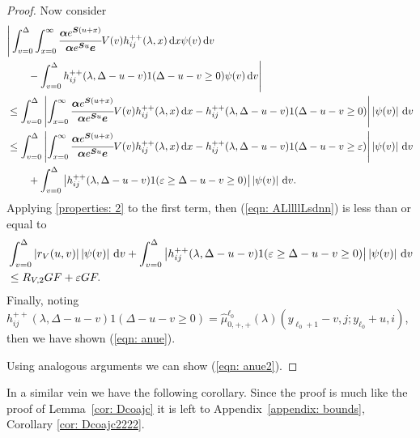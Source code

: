 \begin{proof}
                Now consider 
                \begin{align}
                	&\Bigg|\int_{v=0}^\Delta \int_{x=0}^\infty \cfrac{\boldsymbol \alpha e^{\boldsymbol{S}(u+x)} }{\boldsymbol \alpha e^{\boldsymbol{S}u} \boldsymbol e} V(v)h_{ij}^{++} (\lambda,x)\, \mathrm{d} x \psi(v)\, \mathrm{d} v  \nonumber 
		\\&\qquad{}- \int_{v=0}^\Delta h_{ij}^{++}(\lambda,\Delta-u-v) 1(\Delta-u-v\geq 0) \psi(v)\, \mathrm{d} v\Bigg| \nonumber 
                	\\&\leq \int_{v=0}^\Delta \left|  \int_{x=0}^\infty \cfrac{\boldsymbol \alpha e^{\boldsymbol{S}(u+x)} }{\boldsymbol \alpha e^{\boldsymbol{S}u} \boldsymbol e} V(v)h_{ij}^{++} (\lambda,x)\, \mathrm{d} x  - h_{ij}^{++}(\lambda,\Delta-u-v) 1(\Delta-u-v\geq 0) \right| \left| \psi(v) \right| \, \mathrm{d} v\nonumber 
                	\\&\leq \int_{v=0}^\Delta \left|  \int_{x=0}^\infty \cfrac{\boldsymbol \alpha e^{\boldsymbol{S}(u+x)} }{\boldsymbol \alpha e^{\boldsymbol{S}u} \boldsymbol e} V(v)h_{ij}^{++} (\lambda,x)\, \mathrm{d} x  - h_{ij}^{++}(\lambda,\Delta-u-v) 1(\Delta-u-v\geq \varepsilon) \right| \left| \psi(v) \right| \, \mathrm{d} v\nonumber 
                	\\&\qquad {}+ \int_{v=0}^\Delta \left| h_{ij}^{++}(\lambda,\Delta-u-v) 1(\varepsilon \geq \Delta-u-v\geq 0) \right| \left| \psi(v) \right| \, \mathrm{d} v. \label{eqn: ALllllLsdnn}
                \end{align}
                Applying \ref{properties: 2} to the first term, then (\ref{eqn: ALllllLsdnn}) is less than or equal to 
                \begin{align}
                	& \int_{v=0}^\Delta |r_V(u,v)| \left| \psi(v) \right| \, \mathrm{d} v 
                	+ \int_{v=0}^\Delta \left| h_{ij}^{++}(\lambda,\Delta-u-v) 1(\varepsilon \geq \Delta-u-v\geq 0) \right| \left| \psi(v) \right| \, \mathrm{d} v\nonumber 
                	\\&\leq R_{V,2} GF + \varepsilon GF. \nonumber 
                \end{align}
                Finally, noting \(h_{ij}^{++}(\lambda,\Delta-u-v) 1(\Delta-u-v\geq 0)=\widehat \mu_{0,+,+}^{\ell_0}(\lambda)(y_{\ell_0+1}-v,j;y_{\ell_0}+u,i)\), then we have shown (\ref{eqn: anue}). 
                
                Using analogous arguments we can show  (\ref{eqn: anue2}).
\end{proof}
In a similar vein we have the following corollary. Since the proof is much like the proof of Lemma~\ref{cor: Dcoajc} it is left to Appendix~\ref{appendix: bounds}, Corollary \ref{cor: Dcoajc2222}. 
